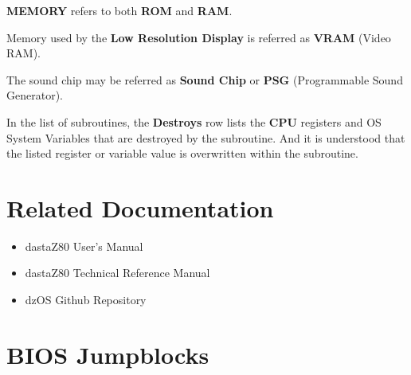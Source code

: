 \documentclass[a4paper,11pt]{article}
\begin{document}
    \textbf{MEMORY} refers to both \textbf{ROM} and \textbf{RAM}.

    Memory used by the \textbf{Low Resolution Display} is referred as
    \textbf{VRAM} (Video RAM).

    The sound chip may be referred as \textbf{Sound Chip} or \textbf{PSG}
    (Programmable Sound Generator).

    In the list of subroutines, the \textbf{Destroys} row lists the \textbf{CPU}
    registers and OS System Variables that are destroyed by the subroutine. And 
    it is understood that the listed register or variable value is overwritten
    within the subroutine.

    \pagebreak
    \section*{Related Documentation}
    \begin{itemize}
        \item dastaZ80 User's Manual\cite{dastaz80userman}
        \item dastaZ80 Technical Reference Manual\cite{dastaz80techman}
        \item dzOS Github Repository\cite{dastaZ80github}
    \end{itemize}

    \pagebreak
    \tableofcontents

    \pagebreak
    \pagestyle{fancy}
    \fancyhf{}
    \fancyfoot[R]{\thepage}
    \setcounter{page}{1}
    
    
    \pagebreak
    
    \pagebreak
    \begingroup
        \let\clearpage\relax
        \section{BIOS Jumpblocks}
        
        
        
        
        
        
        
        
        
    \endgroup
    \pagebreak
    \begingroup
        \let\clearpage\relax
\end{document}
